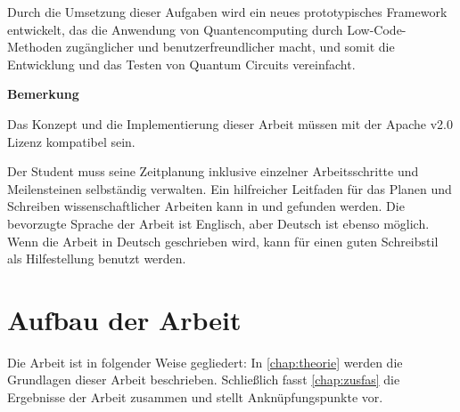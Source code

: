 Durch die Umsetzung dieser Aufgaben wird ein neues prototypisches
Framework entwickelt, das die Anwendung von Quantencomputing durch
Low-Code-Methoden zugänglicher und benutzerfreundlicher macht, und somit
die Entwicklung und das Testen von Quantum Circuits vereinfacht.

\textbf{Bemerkung}

Das Konzept und die Implementierung dieser Arbeit müssen mit der Apache
v2.0 Lizenz kompatibel sein.

Der Student muss seine Zeitplanung inklusive einzelner Arbeitsschritte
und Meilensteinen selbständig verwalten. Ein hilfreicher Leitfaden für
das Planen und Schreiben wissenschaftlicher Arbeiten kann in \cite{Deininger200X} und
\cite{Zobel2004} gefunden werden. Die bevorzugte Sprache der Arbeit ist Englisch,
aber Deutsch ist ebenso möglich. Wenn die Arbeit in Deutsch geschrieben
wird, kann \cite{Rechenberg2006} für einen guten Schreibstil als Hilfestellung benutzt
werden.

\section{Aufbau der Arbeit}

Die Arbeit ist in folgender Weise gegliedert:
In \cref{chap:theorie} werden die Grundlagen dieser Arbeit beschrieben.
Schließlich fasst \cref{chap:zusfas} die Ergebnisse der Arbeit zusammen und stellt Anknüpfungspunkte vor.


